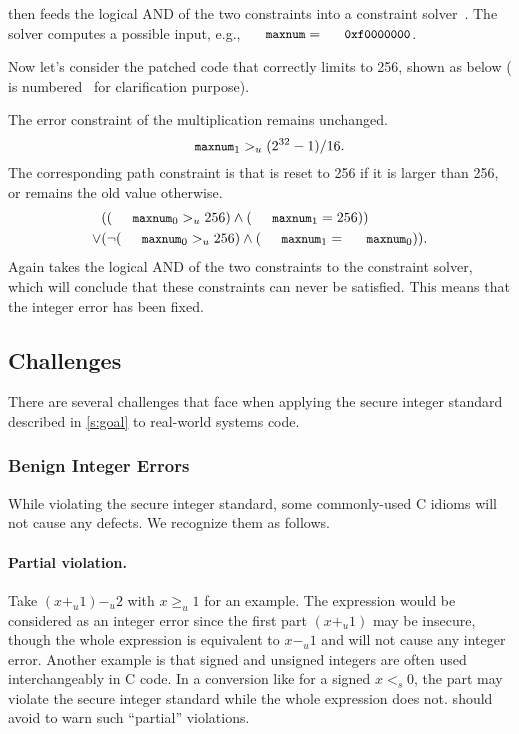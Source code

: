 \sys then feeds the logical AND of the two constraints into a
constraint solver~\cite{boolector}.  The solver computes a possible
input, e.g., $\cc{maxnum} = \cc{0xf0000000}$.

Now let's consider the patched code that correctly limits 
to 256, shown as below ( is
numbered~\cite[\chapterautorefname~8.11]{whale} for clarification
purpose).

The error constraint of the multiplication remains unchanged.
\begin{equation*}
\cc{maxnum}_1 >_u (2^{32} - 1) / 16.
\end{equation*}
The corresponding path constraint is that  is reset to 256
if it is larger than 256, or remains the old value otherwise.
\begin{align*}
& ((\cc{maxnum}_0 >_u 256) \land (\cc{maxnum}_1 = 256)) \\
\lor
& (\neg (\cc{maxnum}_0 >_u 256) \land (\cc{maxnum}_1 = \cc{maxnum}_0)).
\end{align*}
Again \sys takes the logical AND of the two constraints to the
constraint solver, which will conclude that these constraints can
never be satisfied.  This means that the integer error has been
fixed.

\subsection{Challenges}
\label{s:chal}

There are several challenges that face \sys when applying the
secure integer standard described in \autoref{s:goal} to real-world
systems code.

\subsubsection{Benign Integer Errors}

While violating the secure integer standard, some commonly-used C
idioms will not cause any defects.  We recognize them as follows.

\paragraph{Partial violation.}
Take $(x +_u 1) -_u 2$ with $x \geq_u 1$ for an example.  The
expression would be considered as an integer error since the first
part $(x +_u 1)$ may be insecure, though the whole expression is
equivalent to $x -_u 1$ and will not cause any integer error.
Another example is that signed and unsigned integers are often used
interchangeably in C code.  In a conversion like 
for a signed $x <_s 0$, the part  may violate the
secure integer standard while the whole expression does not.  \sys
should avoid to warn such ``partial'' violations.

